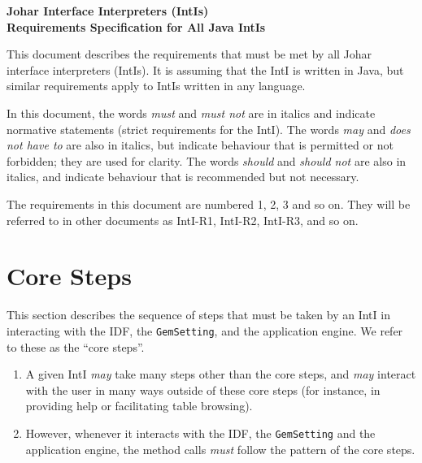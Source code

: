 \documentclass[11pt]{article}
\newcommand{\must}{{\it must}}
\newcommand{\mustnot}{{\it must not}}
\newcommand{\may}{{\it may}}
\newcommand{\doesnothaveto}{{\it does not have to}}
\newcommand{\should}{{\it should}}
\newcommand{\shouldnot}{{\it should not}}
\newcounter{coreReq}
\begin{document}
\begin{center} \bf \Large
Johar Interface Interpreters (IntIs) \\
Requirements Specification for All Java IntIs
\end{center}

This document describes the requirements that must be met by all Johar
interface interpreters (IntIs).  It is assuming that the IntI is written
in Java, but similar requirements apply to IntIs written in any language.

In this document, the words {\must} and {\mustnot} are in italics and
indicate normative statements (strict requirements for the IntI).  The
words {\may} and {\doesnothaveto} are also in italics, but indicate
behaviour that is permitted or not forbidden; they are used for clarity. 
The words {\should} and {\shouldnot} are also in italics, and indicate
behaviour that is recommended but not necessary.

The requirements in this document are numbered 1, 2, 3 and so on.
They will be referred to in other documents as IntI-R1, IntI-R2, IntI-R3,
and so on.

\section{Core Steps}

This section describes the sequence of steps that must be taken by an IntI
in interacting with the IDF, the {\tt GemSetting}, and the application
engine.  We refer to these as the ``core steps''.

\begin{enumerate}
\item A given IntI {\may} take many steps other than the
  core steps, and {\may} interact with the user in many ways outside of
  these core steps (for instance, in providing help or facilitating table
  browsing).
\item However, whenever it interacts with the IDF, the
  {\tt GemSetting} and the application engine, the method calls {\must}
  follow the pattern of the core steps.
\setcounter{coreReq}{\value{enumi}}
\end{enumerate}
\end{document}
